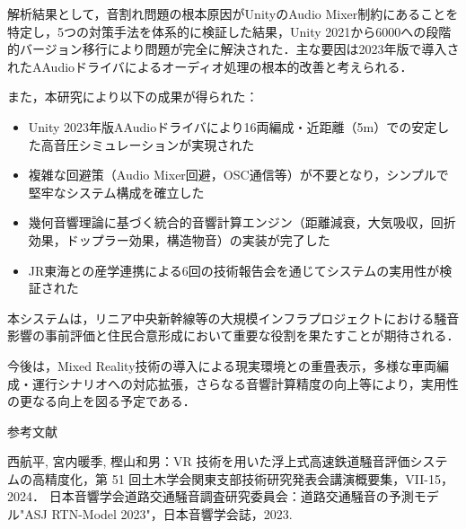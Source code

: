 \documentclass[10pt]{jsarticle}
\begin{document}
解析結果として，音割れ問題の根本原因がUnityのAudio Mixer制約にあることを特定し，5つの対策手法を体系的に検証した結果，Unity 2021から6000への段階的バージョン移行により問題が完全に解決された．主な要因は2023年版で導入されたAAudioドライバによるオーディオ処理の根本的改善と考えられる．

また，本研究により以下の成果が得られた：
\begin{itemize}
\item Unity 2023年版AAudioドライバにより16両編成・近距離（5m）での安定した高音圧シミュレーションが実現された
\item 複雑な回避策（Audio Mixer回避，OSC通信等）が不要となり，シンプルで堅牢なシステム構成を確立した
\item 幾何音響理論に基づく統合的音響計算エンジン（距離減衰，大気吸収，回折効果，ドップラー効果，構造物音）の実装が完了した
\item JR東海との産学連携による6回の技術報告会を通じてシステムの実用性が検証された
\end{itemize}

本システムは，リニア中央新幹線等の大規模インフラプロジェクトにおける騒音影響の事前評価と住民合意形成において重要な役割を果たすことが期待される．

今後は，Mixed Reality技術の導入による現実環境との重畳表示，多様な車両編成・運行シナリオへの対応拡張，さらなる音響計算精度の向上等により，実用性の更なる向上を図る予定である．

参考文献
\begin{thebibliography}{9}
 西航平, 宮内暖季, 樫山和男：VR 技術を用いた浮上式高速鉄道騒音評価システムの高精度化，第 51 回土木学会関東支部技術研究発表会講演概要集，VII-15， 2024．
 日本音響学会道路交通騒音調査研究委員会：道路交通騒音の予測モデル"ASJ RTN-Model 2023"，日本音響学会誌，2023.
\end{thebibliography}
\end{document}
